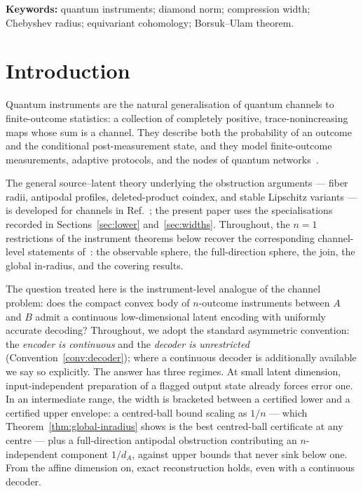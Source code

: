\documentclass[11pt,a4paper]{article}
\begin{document}
\noindent\textbf{Keywords:} quantum instruments; diamond norm; compression width; Chebyshev radius; equivariant cohomology; Borsuk--Ulam theorem.

\section{Introduction}
\label{sec:intro}

Quantum instruments are the natural generalisation of quantum channels to finite-outcome statistics: a collection of completely positive, trace-nonincreasing maps whose sum is a channel. They describe both the probability of an outcome and the conditional post-measurement state, and they model finite-outcome measurements, adaptive protocols, and the nodes of quantum networks~\cite{DaviesLewis1970,Ozawa1984,ChiribellaEtAl2009Instruments,ChiribellaEtAl2008Combs}.

The general source--latent theory underlying the obstruction arguments --- fiber radii, antipodal profiles, deleted-product coindex, and stable Lipschitz variants --- is developed for channels in Ref.~\cite{CompanionChannels}; the present paper uses the specialisations recorded in Sections~\ref{sec:lower} and~\ref{sec:widths}. Throughout, the $n=1$ restrictions of the instrument theorems below recover the corresponding channel-level statements of~\cite{CompanionChannels}: the observable sphere, the full-direction sphere, the join, the global in-radius, and the covering results.

The question treated here is the instrument-level analogue of the channel problem: does the compact convex body of $n$-outcome instruments between $A$ and $B$ admit a continuous low-dimensional latent encoding with uniformly accurate decoding? Throughout, we adopt the standard asymmetric convention: the \emph{encoder is continuous} and the \emph{decoder is unrestricted} (Convention~\ref{conv:decoder}); where a continuous decoder is additionally available we say so explicitly. The answer has three regimes. At small latent dimension, input-independent preparation of a flagged output state already forces error one. In an intermediate range, the width is bracketed between a certified lower and a certified upper envelope: a centred-ball bound scaling as $1/n$ --- which Theorem~\ref{thm:global-inradius} shows is the best centred-ball certificate at any centre --- plus a full-direction antipodal obstruction contributing an $n$-independent component $1/d_A$, against upper bounds that never sink below one. From the affine dimension on, exact reconstruction holds, even with a continuous decoder.
\end{document}

